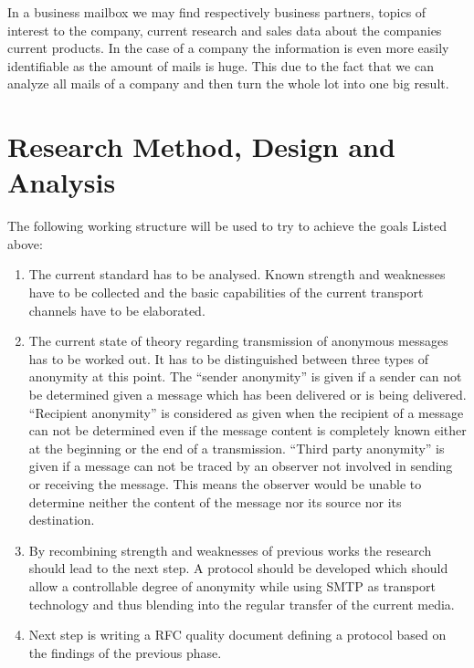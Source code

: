 \documentclass[twocolumn,a4paper,10pt,english]{scrartcl}
\begin{document}
In a business mailbox we may find respectively business partners, topics of interest to the company, current research and sales data about the companies current products. In the case of a company the information is even more easily identifiable as the amount of mails is huge. This due to the fact that we can analyze all mails of a company and then turn the whole lot into one big result.\par

\section{Research Method, Design and Analysis}
The following working structure will be used to try to achieve the goals Listed above:\par
\begin{enumerate}
\item The current standard has to be analysed. Known strength and weaknesses have to be collected and the basic capabilities of the current transport channels have to be elaborated. \par

\item The current state of theory regarding transmission of anonymous messages has to be worked out. It has to be distinguished between three types of anonymity at this point. The ``sender anonymity'' is given if a sender can not be determined given a message which has been delivered or is being delivered. ``Recipient anonymity'' is considered as given when the recipient of a message can not be determined even if the message content is completely known either at the beginning or the end of a transmission. ``Third party anonymity'' is given if a message can not be traced by an observer not involved in sending or receiving the message. This means the observer would be unable to determine neither the content of the message nor its source nor its destination. \par

\item By recombining strength and weaknesses of previous works the research should lead to the next step. A protocol should be developed which should allow a controllable degree of anonymity while using SMTP as transport technology and thus blending into the regular transfer of the current media. \par

\item Next step is writing a RFC quality document defining a protocol based on the findings of the previous phase. \par


\end{enumerate}
\end{document}
